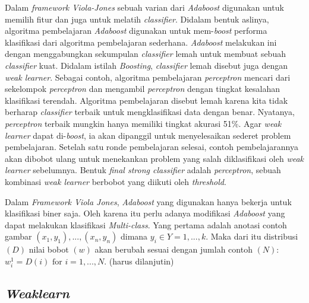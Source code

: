 Dalam \emph{framework Viola-Jones} sebuah varian dari \emph{Adaboost} 
digunakan untuk memilih fitur dan juga untuk melatih \textit{classifier}. 
Didalam bentuk aslinya, algoritma pembelajaran \emph{Adaboost} digunakan 
untuk mem-\textit{boost} performa klasifikasi dari algoritma pembelajaran 
sederhana. \emph{Adaboost} melakukan ini dengan menggabungkan sekumpulan 
\emph{classifier} lemah untuk membuat sebuah \emph{classifier} kuat. 
Didalam istilah \emph{Boosting}, \emph{classifier} lemah disebut juga 
dengan \emph{weak learner}. Sebagai contoh, algoritma pembelajaran \emph{perceptron} 
mencari dari sekelompok \emph{perceptron} dan mengambil \emph{perceptron} 
dengan tingkat kesalahan klasifikasi terendah. Algoritma pembelajaran disebut 
lemah karena kita tidak berharap \emph{classifier} terbaik untuk mengklasifikasi 
data dengan benar. Nyatanya, \emph{perceptron} terbaik mungkin 
hanya memiliki tingkat akurasi 51\%. Agar \emph{weak learner} dapat di-\textit{boost}, 
ia akan dipanggil untuk menyelesaikan sederet problem pembelajaran. Setelah 
satu ronde pembelajaran selesai, contoh pembelajarannya akan dibobot ulang 
untuk menekankan problem yang salah diklasifikasi oleh \emph{weak learner} 
sebelumnya. Bentuk \emph{final strong classifier} adalah \emph{perceptron}, 
sebuah kombinasi \emph{weak learner} berbobot yang diikuti oleh \emph{threshold}.

Dalam \emph{Framework Viola Jones}, \emph{Adaboost} yang digunakan hanya bekerja untuk 
klasifikasi biner saja. Oleh karena itu perlu adanya modifikasi \emph{Adaboost} yang 
dapat melakukan klasifikasi \emph{Multi-class}. Yang pertama adalah anotasi 
contoh gambar $(x_1, y_1),...,(x_n, y_n)$ dimana $y_i \in Y = {1,...,k}$. 
Maka dari itu distribusi $(D)$ nilai bobot $(w)$ akan berubah sesuai dengan 
jumlah contoh $(N)$: $w^1_i = D(i) \text{ for } i=1,...,N$. (harus dilanjutin)

\subsection{\emph{Weaklearn}}

